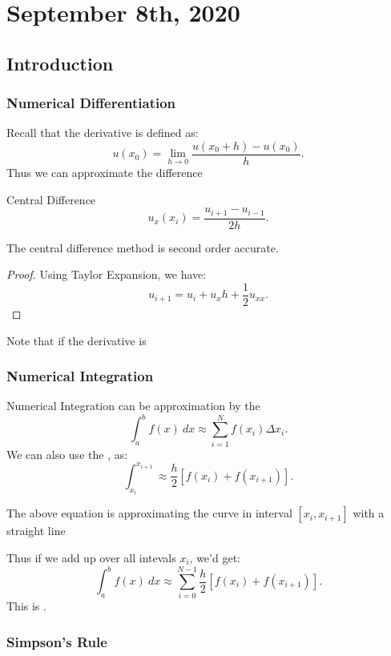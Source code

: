 \documentclass[../main/main.tex]{subfiles}
\begin{document}
\section{September  8th, 2020}
\subsection{Introduction}
\subsubsection{Numerical Differentiation}
Recall that the derivative is defined as: \[
    u(x_0) = \lim\limits_{h \to 0}  \frac{u(x_0+h)-u(x_0)}{h}
.\] 
Thus we can approximate the difference 
\begin{definition}{Central Difference} 
    \[
        u_{x}(x_i) = \frac{u_{i+1}-u_{i-1}}{2h}
    .\] 
\end{definition}
\begin{theorem}
   The central difference method is second order accurate. 
\end{theorem}
\begin{proof}
   Using Taylor Expansion, we have: \[
       u_{i+1} = u_i + u_x h + \frac{1}{2}u_{xx}
   .\]  
\end{proof}
\begin{remark}
    Note that if the derivative is 
\end{remark}
\subsubsection{Numerical Integration}
Numerical Integration can be approximation by the 
\[
    \int^b_a f(x) ~dx \approx \sum_{i=1}^{N} f(x_i) \Delta x_i
.\] 
We can also use the , as: \[
    \int^{x_{i+1}}_{x_i} \approx \frac{h}{2}\left[f(x_i) + f(x_{i+1})\right]
.\] 
\begin{remark}
    The above equation is approximating the curve in interval $[x_i,x_{i+1}]$ with a straight line
\end{remark}
Thus if we add up over all intevals $x_{i}$, we'd get:
 \[
     \int^b_a f(x)~dx \approx \sum_{i=0}^{N-1} \frac{h}{2}\left[f(x_{i})+f(x_{i+1})\right]
 .\] 
 This is .
 \subsubsection{Simpson's Rule}
\end{document}
